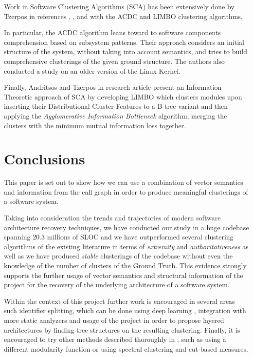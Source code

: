\documentclass[sigconf,review, anonymous]{acmart}
\begin{document}
Work in Software Clustering Algorithms (SCA) has been extensively done by Tzerpos in
references \cite{MoJoFM}, \cite{stability}, \cite{acdc} and \cite{limbo} with the ACDC
and LIMBO clustering algorithms. 

In particular, the ACDC algorithm leans toward to software components comprehension 
based on subsystem patterns. Their approach considers an initial structure of the system, without taking into account semantics, and tries to build comprehensive clusterings of the given ground structure. The authors also conducted a study on an older version of  the Linux Kernel. 

Finally, Andritsos and Tzerpos in research article \cite{limbo} present an Information--Theoretic 
approach of SCA by developing LIMBO which clusters modules upon inserting their Distributional Cluster Features to a B-tree variant and then applying the \emph{Agglomerative Information Bottleneck} algorithm, merging the clusters with the minimum mutual information loss together. 


\section{Conclusions} This paper is set out to show how we can use a combination of vector semantics
and information from the call graph in order to produce meaningful clusterings of a software system.

Taking into consideration the trends and trajectories of modern software architecture recovery techniques, we have conducted our study in a huge codebase spanning 20.3 millions of SLOC and we have outperformed
several clustering algorithms of the existing literature in terms of \emph{extremity} and \emph{authoritativeness} as well as we have produced \emph{stable} clusterings of the codebase 
without even the knowledge of the number of clusters of the Ground Truth. This evidence strongly
supports the further usage of vector semantics and structural information of the project for the 
recovery of the underlying architecture of a software system. 
    
Within the context of this project further work is encouraged in several areas such identifier splitting, 
which can be done using deep learning \cite{splitting}, integration with more static analyzers and usage 
of the project in order to propose layered architectures by finding tree structures on the resulting clustering. 
Finally, it is  encouraged to try other methods described thoroughly in \cite{malliaros}, such as using a 
different modularity function or using spectral clustering and cut-based measures.   
\end{document}
